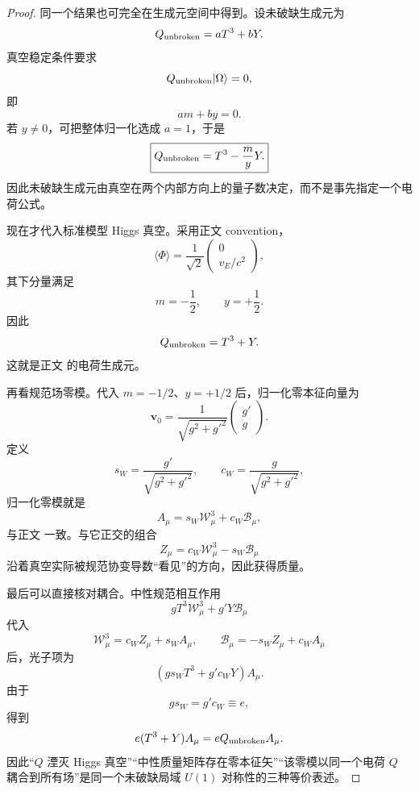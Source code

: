 \begin{proof}
同一个结果也可完全在生成元空间中得到。设未破缺生成元为
\[
Q_{\rm unbroken}
=
aT^3+bY.
\]
真空稳定条件要求
\[
Q_{\rm unbroken}|\Omega\rangle=0,
\]
即
\[
am+by=0.
\]
若 \(y\neq0\)，可把整体归一化选成 \(a=1\)，于是
\[
\boxed{
Q_{\rm unbroken}
=
T^3-\frac{m}{y}Y.
}
\]
因此未破缺生成元由真空在两个内部方向上的量子数决定，而不是事先指定一个电荷公式。

现在才代入标准模型 Higgs 真空。采用正文 convention，
\[
\langle\Phi\rangle
=
\frac1{\sqrt2}
\begin{pmatrix}0\\v_E/c^2\end{pmatrix},
\]
其下分量满足
\[
m=-\frac12,
\qquad
y=+\frac12.
\]
因此
\[
Q_{\rm unbroken}
=
T^3+Y.
\]
这就是正文 的电荷生成元。

再看规范场零模。代入 $m=-1/2$、$y=+1/2$ 后，归一化零本征向量为
\[
\mathbf v_0
=\frac1{\sqrt{g^2+g'^2}}
\begin{pmatrix}g'\\g\end{pmatrix}.
\]
定义
\[
s_W
=
\frac{g'}{\sqrt{g^2+g'^2}},
\qquad
c_W
=
\frac{g}{\sqrt{g^2+g'^2}},
\]
归一化零模就是
\[
A_\mu
=
s_W\mathcal W_\mu^3
+
c_W\mathcal B_\mu,
\]
与正文 一致。与它正交的组合
\[
Z_\mu
=
c_W\mathcal W_\mu^3
-
s_W\mathcal B_\mu
\]
沿着真空实际被规范协变导数“看见”的方向，因此获得质量。

最后可以直接核对耦合。中性规范相互作用
\[
gT^3\mathcal W_\mu^3
+
g'Y\mathcal B_\mu
\]
代入
\[
\mathcal W_\mu^3=c_WZ_\mu+s_WA_\mu,
\qquad
\mathcal B_\mu=-s_WZ_\mu+c_WA_\mu
\]
后，光子项为
\[
\left(
gs_WT^3+g'c_WY
\right)A_\mu.
\]
由于
\[
gs_W=g'c_W
\equiv e,
\]
得到
\[
e(T^3+Y)A_\mu
=
eQ_{\rm unbroken}A_\mu.
\]
因此“\(Q\) 湮灭 Higgs 真空”“中性质量矩阵存在零本征矢”“该零模以同一个电荷 \(Q\) 耦合到所有场”是同一个未破缺局域 \(U(1)\) 对称性的三种等价表述。
\end{proof}


